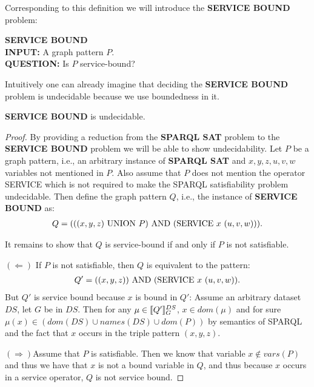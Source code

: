 Corresponding to this definition we will introduce the \textbf{SERVICE BOUND}
problem:
\begin{framed}\noindent \textbf{SERVICE BOUND}\\
	\textbf{INPUT:} A graph pattern $P$.\\
	\textbf{QUESTION:} Is $P$ service-bound?
\end{framed}

Intuitively one can already imagine that deciding the \textbf{SERVICE BOUND}
problem is undecidable because we use boundedness in it.

\begin{theorem}
	\textbf{SERVICE BOUND} is undecidable.
\end{theorem}
\begin{proof}
By providing a reduction from the \textbf{SPARQL SAT} problem to the  
\textbf{SERVICE BOUND} problem we will be able to show undecidability.
Let $P$ be a graph pattern, i.e., an arbitrary instance of \textbf{SPARQL SAT} and
$x,y,z,u,v,w$ variables not mentioned in $P$.
Also assume that $P$ does not mention the operator SERVICE which is not required
to make the SPARQL satisfiability problem undecidable.
Then define the graph pattern $Q$, i.e., the instance of \textbf{SERVICE BOUND} as: 
\begin{align*}
	Q = (((x,y,z) \mbox{ UNION }  P) \mbox{ AND } (\mbox{SERVICE } x \ (u, v, w))).
\end{align*}

\noindent It remains to show that $Q$ is service-bound if and only if $P$ is not
satisfiable.

\bigskip\noindent
$(\Leftarrow)$ \quad If $P$ is not satisfiable, then $Q$ is equivalent to the
pattern: 
\begin{align*}
	Q' = ((x,y,z)) \mbox{ AND } (\mbox{SERVICE} \ x \ (u, v, w)).
\end{align*} 
But $Q'$ is service bound because $x$ is bound in $Q'$: Assume an
arbitrary dataset $DS$, let $G$ be in $DS$. Then 
for any $\mu \in \llbracket Q' \rrbracket^{DS}_G$, $x \in dom(\mu)$ and for sure $\mu(x) \in
(dom(DS) \cup names(DS) \cup dom(P))$ by semantics of SPARQL and the fact that
$x$ occurs in the triple pattern $(x,y,z)$.


\bigskip\noindent
$(\Rightarrow)$\quad Assume that $P$ is satisfiable. Then we know that variable
$x \not\in vars(P)$ and thus we have that $x$ is not a bound variable in $Q$,
and thus because $x$ occurs in a service operator, $Q$ is not service bound.


\end{proof}

